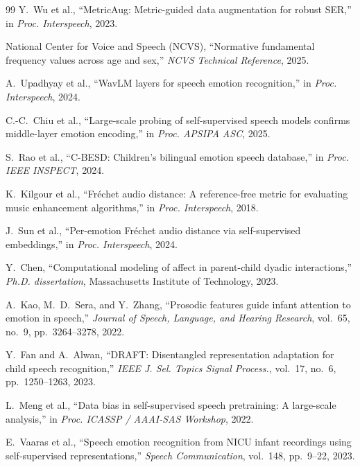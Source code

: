 \documentclass[11pt,a4paper]{article}
\begin{document}
\begin{thebibliography}{99}
Y.~Wu et al.,
``{MetricAug}: Metric-guided data augmentation for robust SER,''
in \textit{Proc. Interspeech}, 2023.

National Center for Voice and Speech (NCVS),
``{N}ormative fundamental frequency values across age and sex,''
\textit{NCVS Technical Reference}, 2025.

A.~Upadhyay et al.,
``{W}avLM layers for speech emotion recognition,''
in \textit{Proc. Interspeech}, 2024.

C.-C.~Chiu et al.,
``{L}arge-scale probing of self-supervised speech models confirms middle-layer emotion encoding,''
in \textit{Proc. APSIPA ASC}, 2025.

S.~Rao et al.,
``{C-BESD}: {C}hildren's bilingual emotion speech database,''
in \textit{Proc. IEEE INSPECT}, 2024.

K.~Kilgour et al.,
``{F}r\'{e}chet audio distance: A reference-free metric for evaluating music enhancement algorithms,''
in \textit{Proc. Interspeech}, 2018.

J.~Sun et al.,
``{P}er-emotion {F}r\'{e}chet audio distance via self-supervised embeddings,''
in \textit{Proc. Interspeech}, 2024.

Y.~Chen,
``{C}omputational modeling of affect in parent-child dyadic interactions,''
\textit{Ph.D. dissertation}, Massachusetts Institute of Technology, 2023.

A.~Kao, M.~D.~Sera, and Y.~Zhang,
``{P}rosodic features guide infant attention to emotion in speech,''
\textit{Journal of Speech, Language, and Hearing Research}, vol.~65, no.~9, pp.~3264--3278, 2022.

Y.~Fan and A.~Alwan,
``{DRAFT}: {D}isentangled representation adaptation for child speech recognition,''
\textit{IEEE J. Sel. Topics Signal Process.}, vol.~17, no.~6, pp.~1250--1263, 2023.

L.~Meng et al.,
``{D}ata bias in self-supervised speech pretraining: A large-scale analysis,''
in \textit{Proc. ICASSP / AAAI-SAS Workshop}, 2022.

E.~Vaaras et al.,
``{S}peech emotion recognition from {NICU} infant recordings using self-supervised representations,''
\textit{Speech Communication}, vol.~148, pp.~9--22, 2023.

\end{thebibliography}
\end{document}
